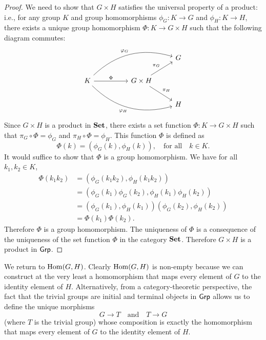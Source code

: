 \begin{proof}
    We need to show that \(G \times H\) satisfies the universal property of a
    product: i.e., for any group \(K\) and group homomorphisms \(\phi_G: K \to
    G\) and \(\phi_H: K \to H\), there exists a unique group homomorphism
    \(\Phi: K \to G \times H\) such that the following diagram commutes:
    \[
        \begin{tikzcd}
            &  &                                                    & G \\
        K \arrow[rr, "\Phi"] \arrow[rrru, "\phi_G", bend left] \arrow[rrrd, "\phi_H"', bend right] &  & G \times H \arrow[rd, "\pi_H"] \arrow[ru, "\pi_G"] &   \\
                    &  &                                                    & H
        \end{tikzcd}
    \]
    Since \(G \times H\) is a product in \(\mathbf{Set}\), there exists a set
    function \(\Phi: K \to G \times H\) such that \(\pi_G \circ \Phi = \phi_G\)
    and \(\pi_H \circ \Phi = \phi_H\). This function \(\Phi\) is defined as
    \[
        \Phi(k) = (\phi_G(k), \phi_H(k)), \quad \text{for all} \quad k \in K.
    \]
    It would suffice to show that \(\Phi\) is a group homomorphism. We have for
    all \(k_1, k_2 \in K\),
    \begin{align*}
        \Phi(k_1k_2) & = (\phi_G(k_1k_2), \phi_H(k_1k_2))\\
        & = (\phi_G(k_1)\phi_G(k_2), \phi_H(k_1)\phi_H(k_2))\\
        & = (\phi_G(k_1), \phi_H(k_1))(\phi_G(k_2), \phi_H(k_2))\\
        & = \Phi(k_1)\Phi(k_2).
    \end{align*}
    Therefore \(\Phi\) is a group homomorphism. The uniqueness of \(\Phi\) is a
    consequence of the uniqueness of the set function \(\Phi\) in the category
    \(\mathbf{Set}\). Therefore \(G \times H\) is a product in \(\mathsf{Grp}\).
\end{proof}


\begin{example}
    We return to \(\operatorname{Hom}(G, H)\). Clearly \(\operatorname{Hom}(G, H)\) is non-empty because we
    can construct at the very least a homomorphism that maps every element of
    \(G\) to the identity element of \(H\). Alternatively, from a
    category-theoretic perspective, the fact that the trivial groups are initial
    and terminal objects in \(\mathsf{Grp}\) allows us to define the unique morphisms
    \[
        G \to T \quad \text{and} \quad T \to G
    \]
    (where \(T\) is the trivial group) whose composition is exactly the
    homomorphism that maps every element of \(G\) to the identity element of
    \(H\).
\end{example}

